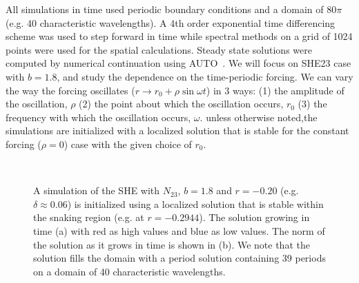 \documentclass[pre,preprint,superscriptaddress]{revtex4-1}
\begin{document}
All simulations in time used periodic boundary conditions and a domain of $80\pi$ (e.g. 40 characteristic wavelengths).  A 4th order exponential time differencing scheme\cite{cox2002} was used to step forward  in time while spectral methods on a grid of 1024 points were used for the spatial calculations.  Steady state solutions were computed by numerical continuation using AUTO~\cite{doedel1981auto}.   We will focus on SHE23 case with $b=1.8$, and study the dependence on the time-periodic forcing. We can vary the way the forcing oscillates ($r\rightarrow r_0+\rho \sin\omega t$) in 3 ways: (1) the amplitude of the oscillation, $\rho$ (2) the point about which the oscillation occurs, $r_0$ (3) the frequency with which the oscillation occurs, $\omega$.    unless otherwise noted,the simulations are initialized with a localized solution that is stable for the constant forcing ($\rho=0$) case with the given choice of $r_0$.  


\begin{figure}[!htb]
  \begin{center}
    \mbox{
       \quad
      }
    \caption{A simulation of the SHE with $N_{23}$, $b=1.8$ and $r=-0.20$ (e.g. $\delta\approx 0.06$) is initialized using a localized solution that is stable within the snaking region (e.g. at $r=-0.2944$). The solution growing in time (a) with red as high values and blue as low values.  The norm of the solution as it grows in time is shown in (b).  We note that the solution fills the domain with a period solution containing 39 periods on a domain of 40 characteristic wavelengths.}
    \label{fig:nucleation1}
  \end{center}
\end{figure}   
\end{document}
